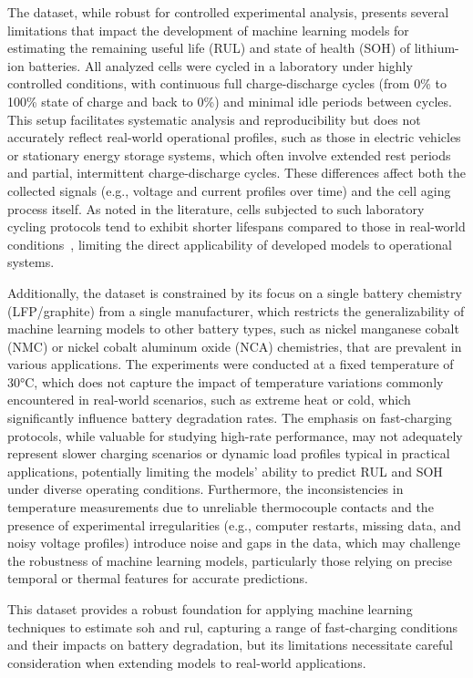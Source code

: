 The dataset, while robust for controlled experimental analysis, presents several limitations that impact the development of machine learning models for estimating the remaining useful life (RUL) and state of health (SOH) of lithium-ion batteries. All analyzed cells were cycled in a laboratory under highly controlled conditions, with continuous full charge-discharge cycles (from 0\% to 100\% state of charge and back to 0\%) and minimal idle periods between cycles. This setup facilitates systematic analysis and reproducibility but does not accurately reflect real-world operational profiles, such as those in electric vehicles or stationary energy storage systems, which often involve extended rest periods and partial, intermittent charge-discharge cycles. These differences affect both the collected signals (e.g., voltage and current profiles over time) and the cell aging process itself. As noted in the literature, cells subjected to such laboratory cycling protocols tend to exhibit shorter lifespans compared to those in real-world conditions~\cite{geslin2025}, limiting the direct applicability of developed models to operational systems.

Additionally, the dataset is constrained by its focus on a single battery chemistry (LFP/graphite) from a single manufacturer, which restricts the generalizability of machine learning models to other battery types, such as nickel manganese cobalt (NMC) or nickel cobalt aluminum oxide (NCA) chemistries, that are prevalent in various applications. The experiments were conducted at a fixed temperature of 30°C, which does not capture the impact of temperature variations commonly encountered in real-world scenarios, such as extreme heat or cold, which significantly influence battery degradation rates. The emphasis on fast-charging protocols, while valuable for studying high-rate performance, may not adequately represent slower charging scenarios or dynamic load profiles typical in practical applications, potentially limiting the models' ability to predict RUL and SOH under diverse operating conditions. Furthermore, the inconsistencies in temperature measurements due to unreliable thermocouple contacts and the presence of experimental irregularities (e.g., computer restarts, missing data, and noisy voltage profiles) introduce noise and gaps in the data, which may challenge the robustness of machine learning models, particularly those relying on precise temporal or thermal features for accurate predictions.

This dataset provides a robust foundation for applying machine learning techniques to estimate \ac{soh} and \ac{rul}, capturing a range of fast-charging conditions and their impacts on battery degradation, but its limitations necessitate careful consideration when extending models to real-world applications.